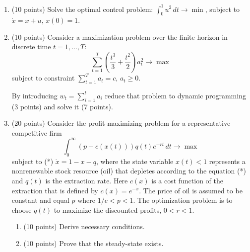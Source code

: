 \documentclass[12pt, a4paper]{article}
\begin{document}
\begin{enumerate}[resume]
\item (10 points) Solve the optimal control problem: $\int_0^1 u^2 \, dt \to \min$, subject to $\dot{x}=x+u$, $x(0)=1$. %
\item (10 points) Consider a maximization problem over the finite horizon in discrete time $t=1,\ldots,T$:
\[
\sum_{t=1}^{T} \left(\frac{t^3}{3}+\frac{t^2}{2}\right)a_t^2 \to \max
\]
subject to constraint $\sum_{t=1}^T a_t=c$, $a_t \geq 0$.

By introducing $w_t=\sum_{i=1}^t a_i$  reduce that problem to dynamic programming (3 points) and solve it (7 points).

\item (20 points) Consider the profit-maximizing problem for a representative competitive firm
\[
\int_0^{\infty} (p-c(x(t)))q(t)e^{-rt} \, dt \to \max
\]
subject to (*) $\dot{x}=1-x-q$, where the state variable  $x(t)<1$ represents a nonrenewable stock resource (oil) that depletes according to the equation (*) and $q(t)$ is the extraction rate. Here $c(x)$ is a cost function of the extraction that is defined by $c(x)=e^{-x}$. The price of oil is assumed to be constant and equal $p$ where $1/e<p<1$.  The optimization problem is to choose $q(t)$ to maximize the discounted profits, $0<r<1$.
\begin{enumerate}
\item (10 points) Derive necessary conditions.
\item (10 points) Prove that the steady-state exists.
\end{enumerate}
\end{enumerate}
\end{document}

